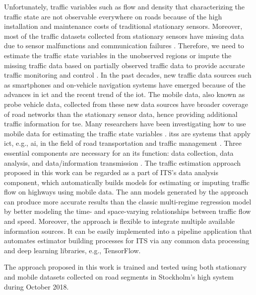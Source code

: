 \documentclass[english]{kththesis}
\begin{document}
Unfortunately, traffic variables such as flow and density that characterizing the traffic state are not observable everywhere on roads because of the high installation and maintenance costs of traditional stationary sensors. Moreover, most of the traffic datasets collected from stationary sensors have missing data due to sensor malfunctions and communication failures \cite{duan_dl_imputation}. Therefore, we need to estimate the traffic state variables in the unobserved regions or impute the missing traffic data based on partially observed traffic data to provide accurate traffic monitoring and control \cite{seo_tse}. In the past decades, new traffic data sources such as smartphones and on-vehicle navigation systems have emerged because of the advances in \gls{ict} and the recent trend of the \gls{iot}. The mobile data, also known as probe vehicle data, collected from these new data sources have broader coverage of road networks than the stationary sensor data, hence providing additional traffic information for \gls{tse}. Many researchers have been investigating how to use mobile data for estimating the traffic state variables \cite{anuar_flow_probe, neumann_bayesian, blandin_individual_speed, Bulteau_flow_higher-order}. \glspl{its} are systems that apply \gls{ict}, e.g., \gls{ai}, in the field of road transportation and traffic management \cite{eu_ITS, sumalee_future_ITS}.  Three essential components are necessary for an \gls{its} function: data collection, data analysis, and data/information transmission \cite{sumalee_future_ITS}. The traffic estimation approach proposed in this work can be regarded as a part of ITS's data analysis component, which automatically builds models for estimating or imputing traffic flow on highways using mobile data. The \gls{ann} models generated by the approach can produce more accurate results than the classic multi-regime regression model by better modeling the time- and space-varying relationships between traffic flow and speed. Moreover, the approach is flexible to integrate multiple available information sources. It can be easily implemented into a pipeline application that automates estimator building processes for ITS via any common data processing and deep learning libraries, e.g., TensorFlow.

The approach proposed in this work is trained and tested using both stationary and mobile datasets collected on road segments in Stockholm's high system during October 2018.\\
\end{document}
